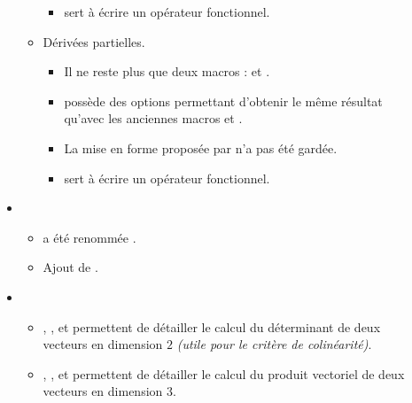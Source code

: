 \documentclass[12pt,a4paper]{book}
\begin{document}
\begin{description}
\begin{itemize}[itemsep=.5em]
\begin{itemize}[itemsep=.5em]
\begin{itemize}[itemsep=.5em, label=$\rightarrow$]
            \item {} sert à écrire un opérateur fonctionnel.
	    \end{itemize}


        \item Dérivées partielles.
        
        \begin{itemize}[itemsep=.5em, label=$\rightarrow$]
            \item Il ne reste plus que deux macros :  et .

            \item {} possède des options permettant d'obtenir le même résultat qu'avec les anciennes macros  et .

            \item La mise en forme proposée par  n'a pas été gardée.

            \item {} sert à écrire un opérateur fonctionnel.
	    \end{itemize}
    \end{itemize}




    \separation
    \item {}
    \begin{itemize}[itemsep=.5em]
        \item {} a été renommée .

        \item Ajout de .
    \end{itemize}




    \separation
    \item {}
    \begin{itemize}[itemsep=.5em]
        \item {}, ,  et  permettent de détailler le calcul du déterminant de deux vecteurs en dimension $2$ \emph{(utile pour le critère de colinéarité)}.


        \item {}, ,  et  permettent de détailler le calcul du produit vectoriel de deux vecteurs en dimension $3$.


\end{itemize}
\end{itemize}
\end{description}
\end{document}
